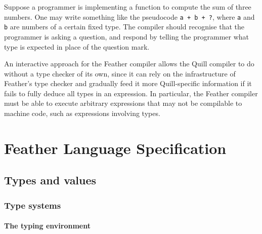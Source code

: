 \documentclass[11pt]{book}
\begin{document}
Suppose a programmer is implementing a function to compute the sum of three numbers.
One may write something like the pseudocode \lstinline{a + b + ?}, where \lstinline{a} and \lstinline{b} are numbers of a certain fixed type.
The compiler should recognise that the programmer is asking a question, and respond by telling the programmer what type is expected in place of the question mark.

An interactive approach for the Feather compiler allows the Quill compiler to do without a type checker of its own, since it can rely on the infrastructure of Feather's type checker and gradually feed it more Quill-specific information if it fails to fully deduce all types in an expression.
In particular, the Feather compiler must be able to execute arbitrary expressions that may not be compilable to machine code, such as expressions involving types.

\mainmatter

\part{Feather Language Specification}

\chapter{Types and values}
\label{ch:types_and_values}

\iffalse{}\section{Objectives}

\subsection{Type system complexity}
\fi{}


\section{Type systems}

\subsection{The typing environment}
\end{document}
